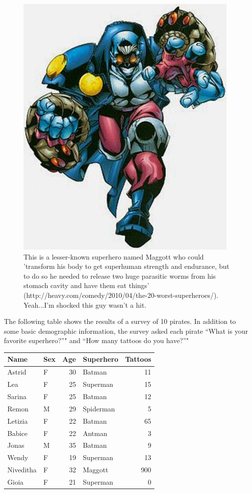 \documentclass[]{book}
\theoremstyle{definition}
\theoremstyle{definition}
\theoremstyle{remark}
\begin{document}
\begin{figure}

{\centering \includegraphics[width=0.5\linewidth]{images/maggot} 

}

\caption{This is a lesser-known superhero named Maggott who could 'transform his body to get superhuman strength and endurance, but to do so he needed to release two huge parasitic worms from his stomach cavity and have them eat things' (http://heavy.com/comedy/2010/04/the-20-worst-superheroes/). Yeah...I'm shocked this guy wasn't a hit.}\label{fig:unnamed-chunk-227}
\end{figure}

The following table shows the results of a survey of 10 pirates. In
addition to some basic demographic information, the survey asked each
pirate ``What is your favorite superhero?''" and ``How many tattoos do
you have?''"

\begin{tabular}{l|l|r|l|r}
\hline
Name & Sex & Age & Superhero & Tattoos\\
\hline
Astrid & F & 30 & Batman & 11\\
\hline
Lea & F & 25 & Superman & 15\\
\hline
Sarina & F & 25 & Batman & 12\\
\hline
Remon & M & 29 & Spiderman & 5\\
\hline
Letizia & F & 22 & Batman & 65\\
\hline
Babice & F & 22 & Antman & 3\\
\hline
Jonas & M & 35 & Batman & 9\\
\hline
Wendy & F & 19 & Superman & 13\\
\hline
Niveditha & F & 32 & Maggott & 900\\
\hline
Gioia & F & 21 & Superman & 0\\
\hline
\end{tabular}
\end{document}
